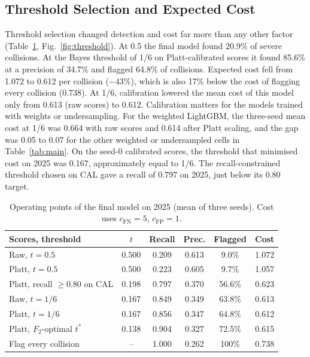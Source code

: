 \documentclass[conference,letterpaper]{IEEEtran}
\begin{document}
\subsection{Threshold Selection and Expected Cost}

Threshold selection changed detection and cost far more than any other factor (Table~\ref{tab:ops}, Fig.~\ref{fig:threshold}). At 0.5 the final model found 20.9\% of severe collisions. At the Bayes threshold of 1/6 on Platt-calibrated scores it found 85.6\% at a precision of 34.7\% and flagged 64.8\% of collisions. Expected cost fell from 1.072 to 0.612 per collision ($-43\%$), which is also 17\% below the cost of flagging every collision (0.738). At 1/6, calibration lowered the mean cost of this model only from 0.613 (raw scores) to 0.612. Calibration matters for the models trained with weights or undersampling. For the weighted LightGBM, the three-seed mean cost at 1/6 was 0.664 with raw scores and 0.614 after Platt scaling, and the gap was 0.05 to 0.07 for the other weighted or undersampled cells in Table~\ref{tab:main}. On the seed-0 calibrated scores, the threshold that minimised cost on 2025 was 0.167, approximately equal to 1/6. The recall-constrained threshold chosen on CAL gave a recall of 0.797 on 2025, just below its 0.80 target.

\begin{table}[t]
\centering
\caption{Operating points of the final model on 2025 (mean of three seeds). Cost uses $c_{\mathrm{FN}}=5$, $c_{\mathrm{FP}}=1$.}
\label{tab:ops}
\setlength{\tabcolsep}{3pt}
\begin{tabular}{@{}lccccc@{}}
\toprule
Scores, threshold & $t$ & Recall & Prec. & Flagged & Cost \\
\midrule
Raw, $t=0.5$ & 0.500 & 0.209 & 0.613 & 9.0\% & 1.072 \\
Platt, $t=0.5$ & 0.500 & 0.223 & 0.605 & 9.7\% & 1.057 \\
Platt, recall $\ge 0.80$ on CAL & 0.198 & 0.797 & 0.370 & 56.6\% & 0.623 \\
Raw, $t=1/6$ & 0.167 & 0.849 & 0.349 & 63.8\% & 0.613 \\
Platt, $t=1/6$ & 0.167 & 0.856 & 0.347 & 64.8\% & 0.612 \\
Platt, $F_2$-optimal $t^{*}$ & 0.138 & 0.904 & 0.327 & 72.5\% & 0.615 \\
Flag every collision & -- & 1.000 & 0.262 & 100\% & 0.738 \\
\bottomrule
\end{tabular}
\end{table}
\end{document}
